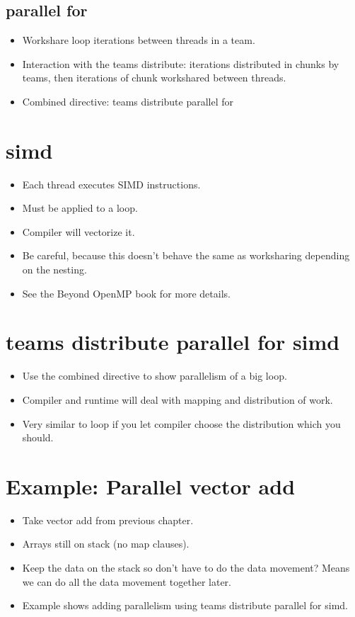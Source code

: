 \subsection{parallel for}
\begin{itemize}
  \item Workshare loop iterations between threads in a team.
  \item Interaction with the teams distribute: iterations distributed in chunks by teams, then iterations of chunk workshared between threads.
  \item Combined directive: teams distribute parallel for
\end{itemize}

\section{simd}
\begin{itemize}
  \item Each thread executes SIMD instructions.
  \item Must be applied to a loop.
  \item Compiler will vectorize it.
  \item Be careful, because this doesn't behave the same as worksharing depending on the nesting.
  \item See the Beyond OpenMP book for more details.
\end{itemize}

\section{teams distribute parallel for simd}
\begin{itemize}
  \item Use the combined directive to show parallelism of a big loop.
  \item Compiler and runtime will deal with mapping and distribution of work.
  \item Very similar to loop if you let compiler choose the distribution which you should.
\end{itemize}

\section{Example: Parallel vector add}
\begin{itemize}
  \item Take vector add from previous chapter.
  \item Arrays still on stack (no map clauses).
  \item Keep the data on the stack so don’t have to do the data movement? Means we can do all the data movement together later.
  \item Example shows adding parallelism using teams distribute parallel for simd.
\end{itemize}

